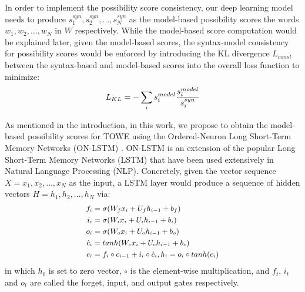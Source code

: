 \documentclass[11pt,a4paper]{article}
\begin{document}
In order to implement the possibility score consistency, our deep learning model needs to produce $s^{syn}_1,s^{syn}_2,\ldots,s^{syn}_N$ as the model-based possibility scores the words $w_1, w_2, \ldots, w_N$ in $W$ respectively. While the model-based score computation would be explained later, given the model-based scores, the syntax-model consistency for possibility scores would be enforced by introducing the KL divergence $L_{const}$ between the syntax-based and model-based scores into the overall loss function to minimize:
\begin{equation}
\small
    L_{KL} = -\sum_i s^{model}_i \frac{s^{model}_i}{s^{syn}_i}
    \label{eq:klloss}
\end{equation}



As mentioned in the introduction, in this work, we propose to obtain the model-based possibility scores for TOWE using the Ordered-Neuron Long Short-Term Memory Networks (ON-LSTM) \cite{Shen2019ordered}. ON-LSTM is an extension of the popular Long Short-Term Memory Networks (LSTM) that have been used extensively in Natural Language Processing (NLP). Concretely, given the vector sequence $X=x_1,x_2,\ldots,x_N$ as the input, a LSTM layer would produce a sequence of hidden vectors $H=h_1,h_2,\ldots,h_N$ via:
\begin{equation}
\small
\begin{split}
    f_i & = \sigma(W_fx_i+U_fh_{i-1}+b_f) \\
    i_i & = \sigma(W_ix_i+U_ih_{i-1}+b_i) \\
    o_i & = \sigma(W_ox_i+U_oh_{i-1}+b_o) \\
    \hat{c}_i & = tanh(W_cx_i+U_ch_{i-1}+b_c) \\
    c_i & = f_i \circ c_{i-1} + i_i \circ \hat{c}_i, h_i  = o_i \circ tanh(c_i)
\end{split}
\end{equation}
in which $h_0$ is set to zero vector, $\circ$ is the element-wise multiplication, and $f_t$, $i_t$ and $o_t$ are called the forget, input, and output gates respectively.
\end{document}
